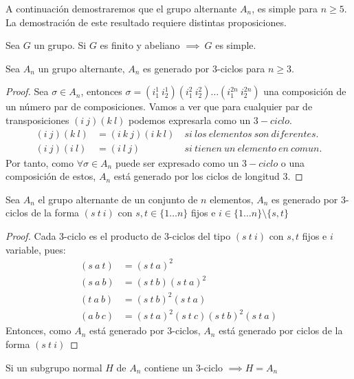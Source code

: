 A continuación demostraremos que el grupo alternante $A_n$, es simple para $n\geq 5$. La demostración de este resultado requiere distintas proposiciones.
\begin{pro}
	Sea $G$ un grupo. Si $G$ es finito y abeliano $\implies\ G$ es simple.
\end{pro}
\begin{pro}
	Sea $A_n$ un grupo alternante, $A_n$ es generado por 3-ciclos para $n\geq 3$.
\end{pro}
\begin{proof}
	Sea $\sigma \in A_n$, entonces $\sigma = (i_1^1\ i_2^1)(i_1^2\ i_2^2)\ldots(i_1^{2n}\ i_2^{2n})$ una composición de un número par de composiciones. Vamos a ver que para cualquier par de transposiciones $(i\ j)(k\ l)$ podemos expresarla como un $3-ciclo$.
	\begin{align*}
		(i\ j)(k\ l) &= (i\ k\ j)(i\ k\ l)\ &si\ los\ elementos\ son\ diferentes.\\
		(i\ j)(i\ l) &= (i\ l\ j)\ &si\ tienen\ un\ elemento\ en\ comun.
	\end{align*}
	Por tanto, como $\forall \sigma \in A_n$ puede ser expresado como un $3-ciclo$ o una composición de estos, $A_n$ está generado por los ciclos de longitud 3.
\end{proof}
\begin{pro}
	\label{pro:alternante3ciclos}
	Sea $A_n$ el grupo alternante de un conjunto de $n$ elementos, $A_n$ es generado por 3-ciclos de la forma $(s\ t\ i)$ con $s,t\in \{1\ldots n\}$ fijos e $i\in\{1\ldots n\}\setminus\{s,t\}$
\end{pro}
\begin{proof}
	Cada 3-ciclo es el producto de 3-ciclos del tipo $(s\ t\ i)$ con $s,t$ fijos e $i$ variable, pues:
	\begin{align*}
		(s\ a\ t) &= (s\ t\ a)^2\\
		(s\ a\ b) &= (s\ t\ b)(s\ t\ a)^2\\
		(t\ a\ b) &= (s\ t\ b)^2(s\ t\ a)\\
		(a\ b\ c) &= (s\ t\ a)^2(s\ t\ c)(s\ t\ b)^2(s\ t\ a)
	\end{align*}
	Entonces, como $A_n$ está generado por 3-ciclos, $A_n$ está generado por ciclos de la forma $(s\ t\ i)$
\end{proof}
\begin{thm}
	\label{thm:subequalsalternate}
	Si un subgrupo normal $H$ de $A_n$ contiene un 3-ciclo $\implies H = A_n$
\end{thm}

